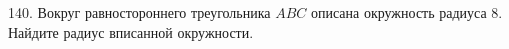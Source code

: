 140. Вокруг равностороннего треугольника $ABC$ описана окружность радиуса 8. Найдите радиус вписанной окружности.\\
